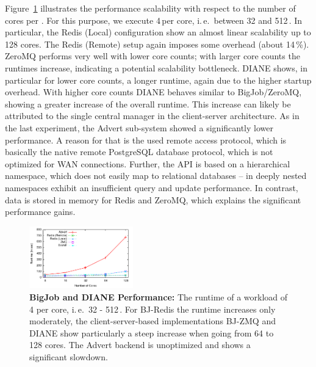 \documentclass[conference]{IEEEtran}
\begin{document}
Figure~\ref{fig:perf_bigjob-varying-cores} illustrates the performance
scalability with respect to the number of cores per \pilot. For this
purpose, we execute 4\,\cus per core, i.\,e.\ between 32 and
512\,\cus. In particular, the Redis (Local) configuration show an
almost linear scalability up to 128 cores.  The Redis (Remote) setup
again imposes some overhead (about 14\,\%). ZeroMQ performs very well
with lower core counts; with larger core counts the runtimes increase,
indicating a potential scalability bottleneck. DIANE shows, in
particular for lower core counts, a longer runtime, again due to the
higher startup overhead. With higher core counts DIANE behaves similar
to BigJob/ZeroMQ, showing a greater increase of the overall
runtime. This increase can likely be attributed to the single central
manager in the client-server architecture. As in the last experiment,
the Advert \cc sub-system showed a significantly lower performance.
A reason for that
is the used remote access protocol, which is basically the native
remote PostgreSQL database protocol, which is not optimized for WAN
connections. Further, the API is based on a hierarchical namespace,
which does not easily map to relational databases -- in deeply nested
namespaces exhibit an insufficient query and update performance. In
contrast, data is stored in memory for Redis and ZeroMQ, which
explains the significant performance gains.


\begin{figure}[t] 
 \centering
 \up
 \includegraphics[width=0.4\textwidth]{../perf/bigjob-varying-cores-alamo.pdf}
 \up
 \caption{\textbf{BigJob and DIANE Performance:}  The
  runtime of a workload of 4 \cus per core, i.\,e.\ 32 - 512\,\cus. For 
BJ-Redis the runtime  increases only moderately, the client-server-based 
implementations BJ-ZMQ and DIANE show particularly a steep increase when going 
from 64 to 128 cores. The Advert backend is unoptimized and 
shows a significant slowdown. \up\up
  }
 \label{fig:perf_bigjob-varying-cores} 
\end{figure}
\end{document}
